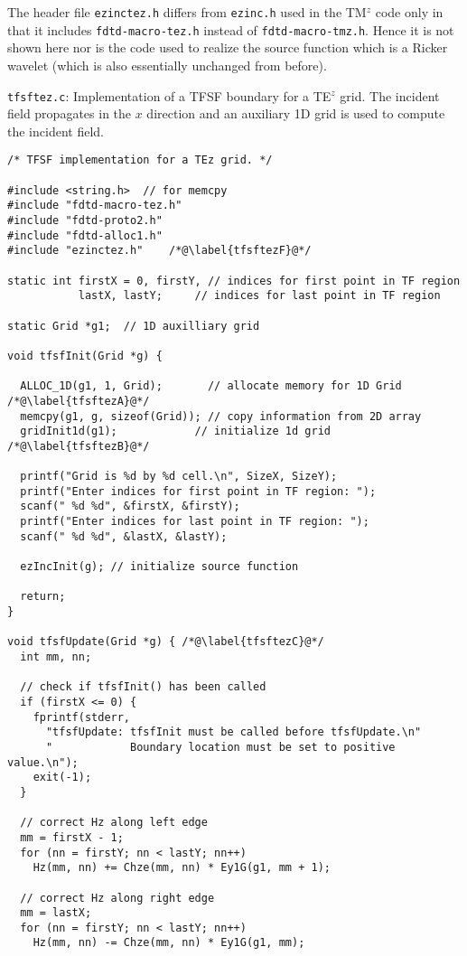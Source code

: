 The header file {\tt ezinctez.h} differs from {\tt ezinc.h} used in
the TM$^z$ code only in that it includes {\tt fdtd-macro-tez.h}
instead of {\tt fdtd-macro-tmz.h}.  Hence it is not shown here nor is
the code used to realize the source function which is a Ricker
wavelet (which is also essentially unchanged from before).

\begin{program}
{\tt tfsftez.c}:  Implementation of a TFSF boundary for a TE$^z$
grid.  The incident field propagates in the $x$ direction and an
auxiliary 1D grid is used to compute the incident field.
\label{pro:tfsftez}
\codemiddle
\begin{lstlisting}
/* TFSF implementation for a TEz grid. */

#include <string.h>  // for memcpy
#include "fdtd-macro-tez.h"
#include "fdtd-proto2.h"
#include "fdtd-alloc1.h"
#include "ezinctez.h"    /*@\label{tfsftezF}@*/

static int firstX = 0, firstY, // indices for first point in TF region 
           lastX, lastY;     // indices for last point in TF region

static Grid *g1;  // 1D auxilliary grid

void tfsfInit(Grid *g) {

  ALLOC_1D(g1, 1, Grid);       // allocate memory for 1D Grid /*@\label{tfsftezA}@*/
  memcpy(g1, g, sizeof(Grid)); // copy information from 2D array
  gridInit1d(g1);            // initialize 1d grid /*@\label{tfsftezB}@*/

  printf("Grid is %d by %d cell.\n", SizeX, SizeY);
  printf("Enter indices for first point in TF region: ");
  scanf(" %d %d", &firstX, &firstY);
  printf("Enter indices for last point in TF region: ");
  scanf(" %d %d", &lastX, &lastY);

  ezIncInit(g); // initialize source function

  return;
}

void tfsfUpdate(Grid *g) { /*@\label{tfsftezC}@*/
  int mm, nn;

  // check if tfsfInit() has been called
  if (firstX <= 0) {
    fprintf(stderr,
      "tfsfUpdate: tfsfInit must be called before tfsfUpdate.\n"
      "            Boundary location must be set to positive value.\n");
    exit(-1);
  }

  // correct Hz along left edge
  mm = firstX - 1;
  for (nn = firstY; nn < lastY; nn++)
    Hz(mm, nn) += Chze(mm, nn) * Ey1G(g1, mm + 1);
  
  // correct Hz along right edge
  mm = lastX;
  for (nn = firstY; nn < lastY; nn++)
    Hz(mm, nn) -= Chze(mm, nn) * Ey1G(g1, mm);
  

\end{lstlisting}
\end{program}
